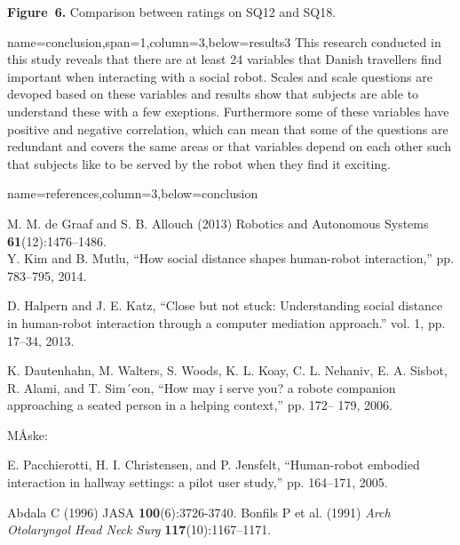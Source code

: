 \documentclass[paperwidth=118cm,paperheight=84cm,landscape,fontscale=0.2941]{baposter}
\begin{document}
\begin{poster}
{\textbf{Figure~6. }Comparison between ratings on SQ12 and SQ18.
}

{name=conclusion,span=1,column=3,below=results3}
{\parskip 5pt
This research conducted in this study reveals that there are at least 24 variables that Danish travellers find important when interacting with a social robot. Scales and scale questions are devoped based on these variables and results show that subjects are able to understand these with a few exeptions. Furthermore some of these variables have positive and negative correlation, which can mean that some of the questions are redundant and covers the same areas or that variables depend on each other such that subjects like to be served by the robot when they find it exciting.
}




{name=references,column=3,below=conclusion}
{
\renewcommand{\section}[2]{}%
\footnotesize
M. M. de Graaf and S. B. Allouch (2013) Robotics and Autonomous
Systems \textbf{61}(12):1476–1486.\\


Y. Kim and B. Mutlu, “How social distance shapes human-robot
interaction,” pp. 783–795, 2014.

D. Halpern and J. E. Katz, “Close but not stuck: Understanding social
distance in human-robot interaction through a computer mediation
approach.” vol. 1, pp. 17–34, 2013.

K. Dautenhahn, M. Walters, S. Woods, K. L. Koay, C. L. Nehaniv, E. A.
Sisbot, R. Alami, and T. Sim´eon, “How may i serve you? a robote
companion approaching a seated person in a helping context,” pp. 172–
179, 2006.

MÅske:

E. Pacchierotti, H. I. Christensen, and P. Jensfelt, “Human-robot embodied
interaction in hallway settings: a pilot user study,” pp. 164–171,
2005.


Abdala C (1996) JASA \textbf{100}(6):3726-3740.
Bonfils P et al. (1991) \textit{Arch Otolaryngol Head Neck Surg} \textbf{117}(10):1167–1171.
}



\end{poster}
\end{document}
